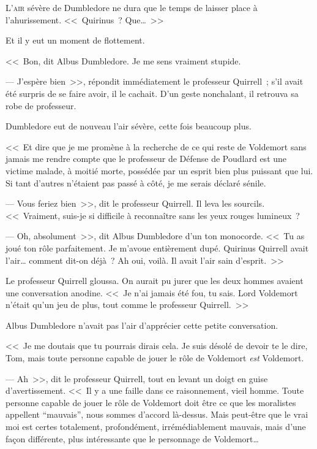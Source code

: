 
\lettrine{L}{'air} sévère de Dumbledore ne dura que le temps de laisser place à l'ahurissement. <<~Quirinus~? Que…~>>

Et il y eut un moment de flottement.

<<~Bon, dit Albus Dumbledore. Je me sens vraiment stupide.

--- J'espère bien~>>, répondit immédiatement le professeur Quirrell~; s'il avait été surpris de se faire avoir, il le cachait. D'un geste nonchalant, il retrouva sa robe de professeur.

Dumbledore eut de nouveau l'air sévère, cette fois beaucoup plus.

<<~Et dire que je me promène à la recherche de ce qui reste de Voldemort sans jamais me rendre compte que le professeur de Défense de Poudlard est une victime malade, à moitié morte, possédée par un esprit bien plus puissant que lui. Si tant d'autres n'étaient pas passé à côté, je me serais déclaré sénile.

--- Vous feriez bien~>>, dit le professeur Quirrell. Il leva les sourcils. <<~Vraiment, suis-je si difficile à reconnaître sans les yeux rouges lumineux~?

--- Oh, absolument~>>, dit Albus Dumbledore d'un ton monocorde. <<~Tu as joué ton rôle parfaitement. Je m'avoue entièrement dupé. Quirinus Quirrell avait l'air… comment dit-on déjà~? Ah oui, voilà. Il avait l'air sain d'esprit.~>>

Le professeur Quirrell gloussa. On aurait pu jurer que les deux hommes avaient une conversation anodine. <<~Je n'ai jamais été fou, tu sais. Lord Voldemort n'était qu'un jeu de plus, tout comme le professeur Quirrell.~>>

Albus Dumbledore n'avait pas l'air d'apprécier cette petite conversation.

<<~Je me doutais que tu pourrais dirais cela. Je suis désolé de devoir te le dire, Tom, mais toute personne capable de jouer le rôle de Voldemort \emph{est} Voldemort.

--- Ah~>>, dit le professeur Quirrell, tout en levant un doigt en guise d'avertissement. <<~Il y a une faille dans ce raisonnement, vieil homme. Toute personne capable de jouer le rôle de Voldemort doit être ce que les moralistes appellent “mauvais”, nous sommes d'accord là-dessus. Mais peut-être que le vrai moi est certes totalement, profondément, irrémédiablement mauvais, mais d'une façon différente, plus intéressante que le personnage de Voldemort…

